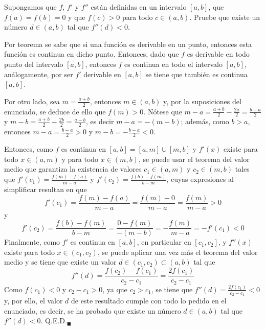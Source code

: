 \begin{enunciado}
 Supongamos que $f$, $f'$ y $f''$ est\'an definidas en un intervalo $[a,b]$, que $f(a) = f(b) = 0$ y que $f(c) > 0$ para todo $c \in (a,b)$. Pruebe que existe un n\'umero $d \in (a,b)$ tal que $f''(d) < 0$.
\end{enunciado}

\begin{solucion}
 Por teorema se sabe que si una funci\'on es derivable en un punto, entonces esta funci\'on es continua en dicho punto. Entonces, dado que $f$ es derivable en todo punto del intervalo $[a,b]$, entonces $f$ es continua en todo el intervalo $[a,b]$, an\'alogamente, por ser $f'$ derivable en $[a,b]$ se tiene que tambi\'en es continua $[a,b]$.
 \par 
 Por otro lado, sea $\displaystyle{m = \frac{a+b}{2}}$, entonces $m \in (a,b)$ y, por la suposiciones del enunciado, se deduce de ello que $f(m) > 0$. N\'otese que $m - a = \frac{a+b}{2} - \frac{2a}{2} = \frac{b-a}{2}$ y $m-b = \frac{a+b}{2} - \frac{2b}{2} = \frac{a-b}{2}$, es decir $m-a = -(m-b)$; adem\'as, como $b>a$, entonces $m-a = \frac{b-a}{2} > 0$ y $m-b = -\frac{b-a}{2} < 0$.
 \par 
 Entonces, como $f$ es continua en $[a,b]=[a,m]\cup[m,b]$ y $f'(x)$ existe para todo $x\in(a,m)$ y para todo $x\in(m,b)$, se puede usar el teorema del valor medio que garantiza la existencia de valores $c_1\in(a,m)$ y $c_2 \in (m,b)$ tales que $f'(c_1) = \frac{f(m)-f(a)}{m-a}$ y $f'(c_2) = \frac{f(b) - f(m)}{b-m}$, cuyas expresiones al simplificar resultan en que
 \begin{equation*}
  f'(c_1) = \frac{f(m) - f(a)}{m-a} = \frac{f(m)- 0}{m-a} = \frac{f(m)}{m-a} > 0
 \end{equation*}
 y
 \begin{equation*}
  f'(c_2) = \frac{f(b) - f(m)}{b-m} = \frac{0-f(m)}{-(m-b)} = -\frac{f(m)}{m-a} = - f'(c_1) < 0
 \end{equation*}
 Finalmente, como $f'$ es continua en $[a,b]$, en particular en $[c_1,c_2]$, y $f''(x)$ existe para todo $x\in(c_1,c_2)$, se puede aplicar una vez m\'as el teorema del valor medio y se tiene que existe un valor $d \in (c_1, c_2) \subset (a,b)$ tal que
 \begin{equation*}
  f''(d) = \frac{f(c_2) - f(c_1)}{c_2 - c_1} = \frac{2f(c_1)}{c_2 - c_1}
 \end{equation*}
 Como $f(c_1) < 0$ y $c_2 - c_1 > 0$, ya que $c_2 > c_1$, se tiene que $\displaystyle{ f''(d) = \frac{2f(c_1)}{c_2 - c_1} < 0 }$ y, por ello, el valor $d$ de este resultado cumple con todo lo pedido en el enunciado, es decir, se ha probado que existe un n\'umero $d \in (a,b)$ tal que $f''(d) < 0$. Q.E.D.${}_{\blacksquare}$
\end{solucion}
